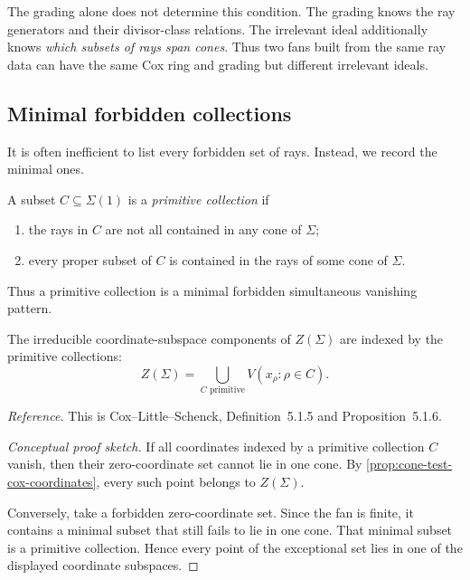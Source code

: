 \begin{warningbox}
The grading alone does not determine this condition. The grading knows
the ray generators and their divisor-class relations. The irrelevant
ideal additionally knows \emph{which subsets of rays span cones}.
Thus two fans built from the same ray data can have the same Cox ring
and grading but different irrelevant ideals.
\end{warningbox}

\subsection{Minimal forbidden collections}

It is often inefficient to list every forbidden set of rays. Instead,
we record the minimal ones.

\begin{definition}
\label{def:primitive-collection}
A subset \(C\subseteq\Sigma(1)\) is a \emph{primitive collection} if

\begin{enumerate}[label=(\alph*),wide=0pt]
\item the rays in \(C\) are not all contained in any cone of
\(\Sigma\);

\item every proper subset of \(C\) is contained in the rays of some
cone of \(\Sigma\).
\end{enumerate}
\end{definition}

Thus a primitive collection is a minimal forbidden simultaneous
vanishing pattern.

\begin{proposition}
\label{prop:exceptional-set-primitive-collections}
The irreducible coordinate-subspace components of \(Z(\Sigma)\) are
indexed by the primitive collections:
\[
\boxed{
Z(\Sigma)
=
\bigcup_{C\text{ primitive}}
V(x_\rho:\rho\in C).
}
\]
\end{proposition}

\noindent
\textit{Reference.}
This is Cox--Little--Schenck, Definition~5.1.5 and
Proposition~5.1.6.

\begin{proof}[Conceptual proof sketch]
If all coordinates indexed by a primitive collection \(C\) vanish,
then their zero-coordinate set cannot lie in one cone. By
\cref{prop:cone-test-cox-coordinates}, every such point belongs to
\(Z(\Sigma)\).

Conversely, take a forbidden zero-coordinate set. Since the fan is
finite, it contains a minimal subset that still fails to lie in one
cone. That minimal subset is a primitive collection. Hence every point
of the exceptional set lies in one of the displayed coordinate
subspaces.
\end{proof}

